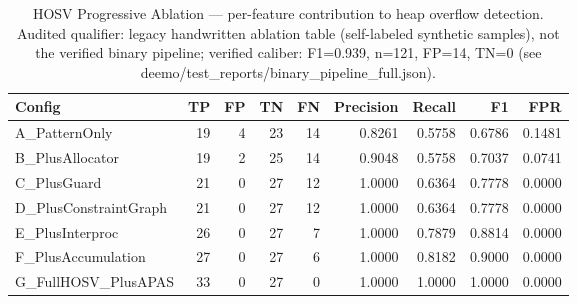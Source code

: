 \begin{table}[t]
\centering
\caption{HOSV Progressive Ablation — per-feature contribution to heap overflow detection. Audited qualifier: legacy handwritten ablation table (self-labeled synthetic samples), not the verified binary pipeline; verified caliber: F1=0.939, n=121, FP=14, TN=0 (see deemo/test_reports/binary_pipeline_full.json).}
\label{tab:hosv_ablation}
\begin{tabular}{lrrrrrrrr}
\toprule
Config & TP & FP & TN & FN & Precision & Recall & F1 & FPR \\
\midrule
  A_PatternOnly & 19 & 4 & 23 & 14 & 0.8261 & 0.5758 & 0.6786 & 0.1481 \\
  B_PlusAllocator & 19 & 2 & 25 & 14 & 0.9048 & 0.5758 & 0.7037 & 0.0741 \\
  C_PlusGuard & 21 & 0 & 27 & 12 & 1.0000 & 0.6364 & 0.7778 & 0.0000 \\ %
  D_PlusConstraintGraph & 21 & 0 & 27 & 12 & 1.0000 & 0.6364 & 0.7778 & 0.0000 \\ %
  E_PlusInterproc & 26 & 0 & 27 & 7 & 1.0000 & 0.7879 & 0.8814 & 0.0000 \\ %
  F_PlusAccumulation & 27 & 0 & 27 & 6 & 1.0000 & 0.8182 & 0.9000 & 0.0000 \\ %
  G_FullHOSV_PlusAPAS & 33 & 0 & 27 & 0 & 1.0000 & 1.0000 & 1.0000 & 0.0000 \\ %
\bottomrule
\end{tabular}
\end{table}
